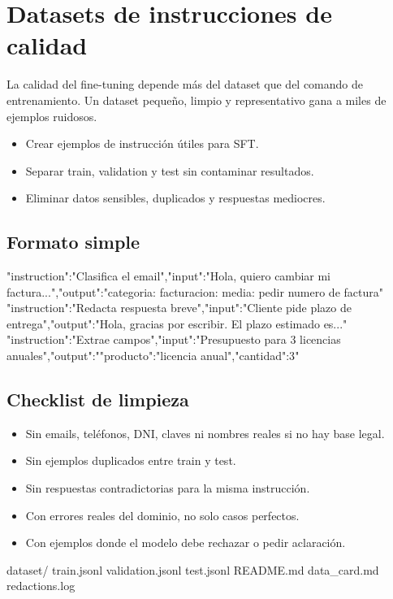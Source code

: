 \documentclass[11pt,a4paper]{book}
\begin{document}
\chapter{Datasets de instrucciones de calidad}
La calidad del fine-tuning depende más del dataset que del comando de entrenamiento. Un dataset pequeño, limpio y representativo gana a miles de ejemplos ruidosos.

\begin{itemize}\item Crear ejemplos de instrucción útiles para SFT.\end{itemize}
\begin{itemize}\item Separar train, validation y test sin contaminar resultados.\end{itemize}
\begin{itemize}\item Eliminar datos sensibles, duplicados y respuestas mediocres.\end{itemize}
\section{Formato simple}
\begin{codebox}
{"instruction":"Clasifica el email","input":"Hola, quiero cambiar mi factura...","output":"categoria: facturacion\nprioridad: media\naccion: pedir numero de factura"}
{"instruction":"Redacta respuesta breve","input":"Cliente pide plazo de entrega","output":"Hola, gracias por escribir. El plazo estimado es..."}
{"instruction":"Extrae campos","input":"Presupuesto para 3 licencias anuales","output":"{"producto":"licencia anual","cantidad":3}"}
\end{codebox}
\section{Checklist de limpieza}
\begin{itemize}\item Sin emails, teléfonos, DNI, claves ni nombres reales si no hay base legal.\end{itemize}
\begin{itemize}\item Sin ejemplos duplicados entre train y test.\end{itemize}
\begin{itemize}\item Sin respuestas contradictorias para la misma instrucción.\end{itemize}
\begin{itemize}\item Con errores reales del dominio, no solo casos perfectos.\end{itemize}
\begin{itemize}\item Con ejemplos donde el modelo debe rechazar o pedir aclaración.\end{itemize}
\begin{codebox}
dataset/
  train.jsonl
  validation.jsonl
  test.jsonl
  README.md
  data_card.md
  redactions.log
\end{codebox}
\end{document}
